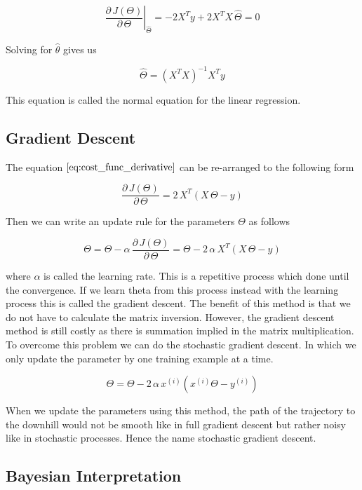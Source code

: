 \documentclass[11pt]{article}
\theoremstyle{definition}
\begin{document}
\begin{equation*}
    \left. \frac{\partial \, J(\Theta)}{\partial\, \Theta} \right|_{\hat{\Theta}} = - 2 X^T y + 2 X^T X \, \hat{\Theta} =  0 \label{eq:cost_func_derivative}
\end{equation*}

Solving for $\hat{\theta}$ gives us

\begin{equation*}
    \hat{\Theta} =  (X^T X)^{-1} X^T y
\end{equation*}

This equation is called the normal equation for the linear regression. 



\subsection{Gradient Descent}

The equation $\ref{eq:cost_func_derivative}$ can be re-arranged to the following form


$$
\frac{\partial \, J(\Theta)}{\partial\, \Theta} = 2\, X^T (X\, \Theta - y)
$$


Then we can write an update rule for the parameters $\Theta$ as follows


$$
\Theta =\Theta - \alpha \, \frac{\partial\, J(\Theta)}{\partial \, \Theta} = \Theta -  2\,\alpha \, X^T (X\, \Theta - y)
$$


where $\alpha$ is called the learning rate. This is a repetitive process which done until the convergence. If we learn theta from this process instead with the learning process this is called the gradient descent. The benefit of this method is that we do not have to calculate the matrix inversion. However, the gradient descent method is still costly as there is summation implied in the matrix multiplication. To overcome this problem we can do the stochastic gradient descent. In which we only update the parameter by one training example at a time. 


$$
\Theta = \Theta - 2\,\alpha\, x^{(i)} (x^{(i)}\Theta - y^{(i)})
$$

When we update the parameters using this method, the path of the trajectory to the downhill would not be smooth like in full gradient descent but rather noisy like in stochastic processes. Hence the name stochastic gradient descent. 



\subsection{Bayesian Interpretation}
\end{document}
